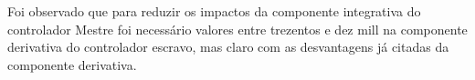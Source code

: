 Foi observado que para reduzir os impactos da componente integrativa do controlador Mestre foi necessário valores
entre trezentos e dez mill na componente derivativa do controlador escravo, mas claro com as desvantagens já citadas
da componente derivativa.